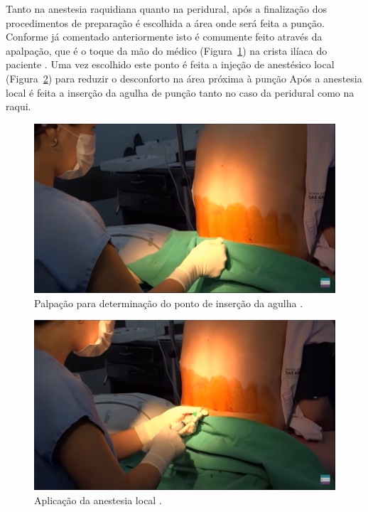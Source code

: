 Tanto na anestesia raquidiana quanto na peridural, após a finalização dos procedimentos de preparação é escolhida a área onde será feita a punção. Conforme já comentado anteriormente isto é comumente feito através da apalpação, que é o toque da mão do médico (Figura~\ref{fig:marcacaoPonto}) na crista ilíaca do paciente \cite{Helayel2010,Isaacs2015}. Uma vez escolhido este ponto é feita a injeção de anestésico local (Figura~\ref{fig:anestesiaLocal}) para reduzir o desconforto na área próxima à punção \cite{Sedicias2018} Após a anestesia local é feita a inserção da agulha de punção tanto no caso da peridural como na raqui.

\begin{figure}[ht!]
    \centering
    \includegraphics[width=0.6\linewidth]{capitulos/figuras/0.marcacaoPonto.png}
    \caption{Palpação para determinação do ponto de inserção da agulha \cite{Londero2018}.}
    \label{fig:marcacaoPonto}
\end{figure}

\begin{figure}[ht!]
    \centering
    \includegraphics[width=0.6\linewidth]{capitulos/figuras/1.AnestesiaLocal.png}
    \caption{Aplicação da anestesia local \cite{Londero2018}.}
    \label{fig:anestesiaLocal}
\end{figure}

